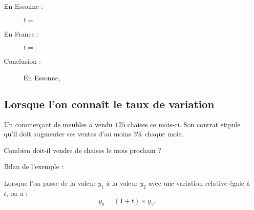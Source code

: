 \documentclass[xcolor={dvipsnames,svgnames,table}]{beamer}
\begin{document}
\begin{frame}
    \begin{Examples}
        \begin{description}
            \item[En Essonne :]$t = $\medskip
            \item[En France :]$t = $\medskip
            \item[Conclusion :]En Essonne, 
        \end{description}
    \end{Examples}
\end{frame}

\subsection{Lorsque l'on connaît le taux de variation}

\begin{frame}
    \begin{Example}
        Un commerçant de meubles a vendu $125$ chaises ce mois-ci. Son contrat stipule qu'il doit augmenter ses ventes d'au moins $3\%$ chaque mois.\par
        Combien doit-il vendre de chaises le mois prochain ?
        
        \rule{0pt}{5cm}
    \end{Example}
\end{frame}

\begin{frame}{Bilan de l'exemple :}

\end{frame}

\begin{frame}
    \begin{Prop}
        Lorsque l'on passe de la valeur $y_1$ à la valeur $y_2$ avec une variation relative égale à $t$, on a :
        \[y_2 = (1 + t) \times y_1.\]
    \end{Prop}
\pause
    \begin{Proof}
\rule{0pt}{3cm}
    \end{Proof}
\end{frame}
\end{document}
